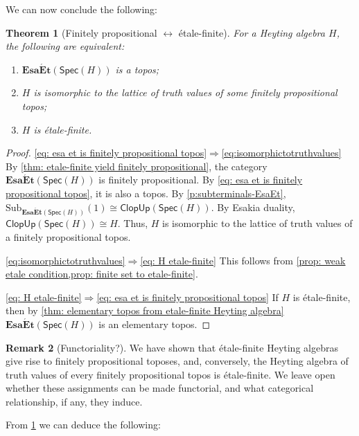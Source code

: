 \documentclass[12pt]{amsart}
\theoremstyle{plain}
\newtheorem{theorem}{Theorem}[section]
\theoremstyle{definition}
\newtheorem{remark}[theorem]{Remark}
\newcommand{\cat}[1]{\mathbf{#1}}
\newcommand{\Spec}{\mathsf{Spec}}
\newcommand{\Sub}{\mathrm{Sub}}
\newcommand{\ClopUp}{\mathsf{ClopUp}}
\newcommand{\EsaEt}{\cat{Esa\acute{E}t}}
\begin{document}
We can now conclude the following:

\begin{theorem}[Finitely propositional $\leftrightarrow$ étale-finite]\label{theorem.fp.etale}
    For a Heyting algebra $H$, the following are equivalent:
    \begin{enumerate}
        \item \label{eq: esa et is finitely propositional topos} $\EsaEt(\Spec(H))$ is a topos;
        \item \label{eq:isomorphictotruthvalues} $H$ is isomorphic to the lattice of truth values of some finitely propositional topos;
        \item \label{eq: H etale-finite} $H$ is étale-finite.
    \end{enumerate}
\end{theorem}
\begin{proof}
    \eqref{eq: esa et is finitely propositional topos}$\Rightarrow$\eqref{eq:isomorphictotruthvalues} By \cref{thm: etale-finite yield finitely propositional}, the category 
    $\EsaEt(\Spec(H))$ is finitely propositional. 
    By \eqref{eq: esa et is finitely propositional topos}, it is also a topos.
    By \cref{p:subterminals-EsaEt}, $\Sub_{\EsaEt(\Spec(H))}(1) \cong \ClopUp(\Spec(H))$. By Esakia duality, $\ClopUp(\Spec(H)) \cong H$. Thus, $H$ is isomorphic to the lattice of truth values of a finitely propositional topos.
    
    \eqref{eq:isomorphictotruthvalues}$\Rightarrow$\eqref{eq: H etale-finite} This follows from \cref{prop: weak etale condition,prop: finite set to etale-finite}. 
    
    \eqref{eq: H etale-finite}$\Rightarrow$\eqref{eq: esa et is finitely propositional topos} If $H$ is étale-finite, then by \cref{thm: elementary topos from etale-finite Heyting algebra} $\EsaEt(\Spec(H))$ is an elementary topos.
\end{proof}

\begin{remark}[Functoriality?]
    We have shown that étale-finite Heyting algebras give rise to finitely propositional toposes, and, conversely, the Heyting algebra of truth values of every finitely propositional topos is étale-finite. We leave open whether these assignments can be made functorial, and what categorical relationship, if any, they induce.
\end{remark}



From \cref{theorem.fp.etale} we can deduce the following:
\end{document}
